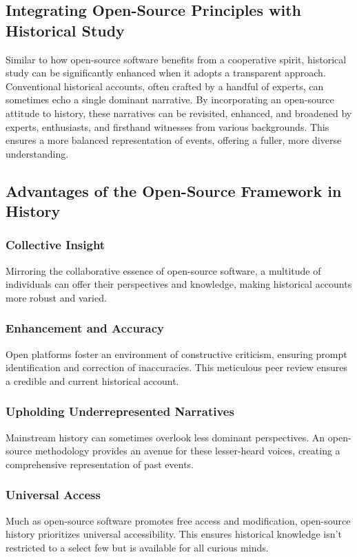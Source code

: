 \documentclass[a4paper,12pt]{book}
\begin{document}
\subsection*{Integrating Open-Source Principles with Historical Study}
Similar to how open-source software benefits from a cooperative spirit, historical study can be significantly enhanced when it adopts a transparent approach. Conventional historical accounts, often crafted by a handful of experts, can sometimes echo a single dominant narrative. By incorporating an open-source attitude to history, these narratives can be revisited, enhanced, and broadened by experts, enthusiasts, and firsthand witnesses from various backgrounds. This ensures a more balanced representation of events, offering a fuller, more diverse understanding.

\subsection*{Advantages of the Open-Source Framework in History}
\subsubsection*{Collective Insight}
Mirroring the collaborative essence of open-source software, a multitude of individuals can offer their perspectives and knowledge, making historical accounts more robust and varied.

\subsubsection*{Enhancement and Accuracy}
Open platforms foster an environment of constructive criticism, ensuring prompt identification and correction of inaccuracies. This meticulous peer review ensures a credible and current historical account.

\subsubsection*{Upholding Underrepresented Narratives}
Mainstream history can sometimes overlook less dominant perspectives. An open-source methodology provides an avenue for these lesser-heard voices, creating a comprehensive representation of past events.

\subsubsection*{Universal Access}
Much as open-source software promotes free access and modification, open-source history prioritizes universal accessibility. This ensures historical knowledge isn't restricted to a select few but is available for all curious minds.
\end{document}
